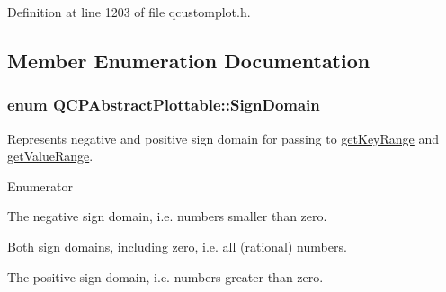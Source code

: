 Definition at line 1203 of file qcustomplot.\-h.



\subsection{Member Enumeration Documentation}
\hypertarget{class_q_c_p_abstract_plottable_a661743478a1d3c09d28ec2711d7653d8}{
\subsubsection[{Sign\-Domain}]{\setlength{\rightskip}{0pt plus 5cm}enum {\bf Q\-C\-P\-Abstract\-Plottable\-::\-Sign\-Domain}\hspace{0.3cm}{\ttfamily [protected]}}}\label{class_q_c_p_abstract_plottable_a661743478a1d3c09d28ec2711d7653d8}
Represents negative and positive sign domain for passing to \hyperlink{class_q_c_p_abstract_plottable_a7aa24ed0b3c39bd99338c7b9f145a71b}{get\-Key\-Range} and \hyperlink{class_q_c_p_abstract_plottable_aed35cfebe5546feea7af2638dd869d5f}{get\-Value\-Range}. \begin{Desc}
\item[Enumerator]\par
\begin{description}
\item[{\em 
\hypertarget{class_q_c_p_abstract_plottable_a661743478a1d3c09d28ec2711d7653d8a0fc9a70796ef60ad18ddd18056e6dc63}{sd\-Negative}\label{class_q_c_p_abstract_plottable_a661743478a1d3c09d28ec2711d7653d8a0fc9a70796ef60ad18ddd18056e6dc63}
}]The negative sign domain, i.\-e. numbers smaller than zero. \item[{\em 
\hypertarget{class_q_c_p_abstract_plottable_a661743478a1d3c09d28ec2711d7653d8a082b98cfb91a7363a3b5cd17b0c1cd60}{sd\-Both}\label{class_q_c_p_abstract_plottable_a661743478a1d3c09d28ec2711d7653d8a082b98cfb91a7363a3b5cd17b0c1cd60}
}]Both sign domains, including zero, i.\-e. all (rational) numbers. \item[{\em 
\hypertarget{class_q_c_p_abstract_plottable_a661743478a1d3c09d28ec2711d7653d8a02951859f243a4d24e779cfbb5471030}{sd\-Positive}\label{class_q_c_p_abstract_plottable_a661743478a1d3c09d28ec2711d7653d8a02951859f243a4d24e779cfbb5471030}
}]The positive sign domain, i.\-e. numbers greater than zero. \end{description}
\end{Desc}


